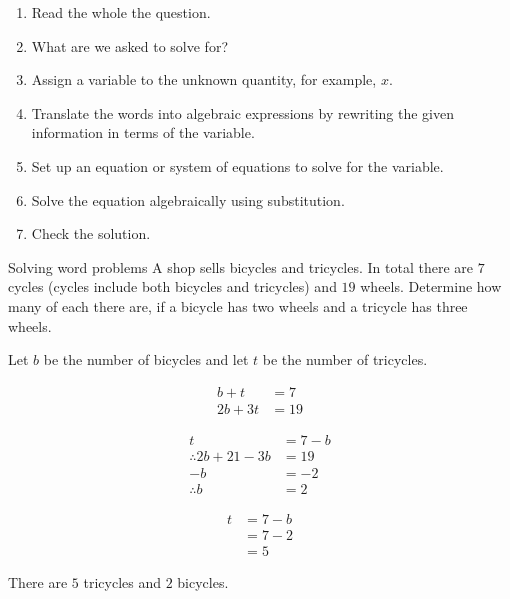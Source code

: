 \begin{enumerate}[noitemsep, label=\textbf{\arabic*}. ] 
\item Read the whole the question.
\item What are we asked to solve for?
\item Assign a variable to the unknown quantity, for example, $x$.
\item  Translate the words into algebraic expressions by rewriting the given information in terms of the variable. 
\item Set up an equation or system of equations to solve for the variable.
\item Solve the equation algebraically using substitution.
\item Check the solution.
\end{enumerate}
\begin{wex}
{Solving word problems}
{%
A shop sells bicycles and tricycles. In total there are $7$ cycles (cycles include both bicycles and tricycles) and $19$ wheels. Determine how many of each there are, if a bicycle has two wheels and a tricycle has three wheels.
}
{
Let $b$ be the number of bicycles and let $t$ be the number of tricycles. 

\begin{align*}
  b + t &= 7 \\
  2b + 3t &= 19
\end{align*}

\begin{align*}
  t &= 7-b \\
  \therefore 2b + 21 - 3b &= 19 \\
  -b &= -2 \\
  \therefore b &= 2
\end{align*}

\begin{align*}
  t &= 7-b \\
    &= 7-2 \\
    &= 5
\end{align*}

There are $5$ tricycles and $2$ bicycles.
}       
\end{wex}

